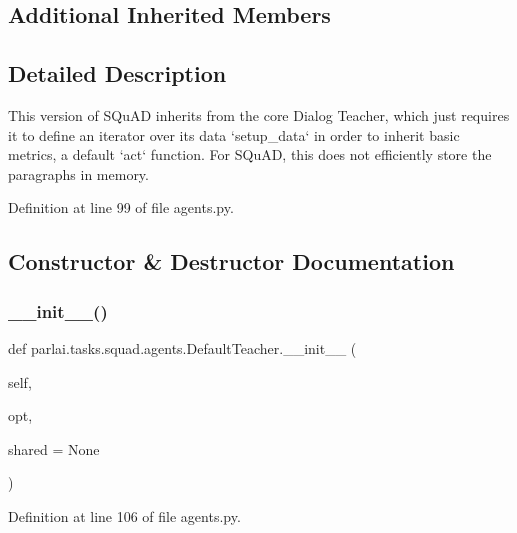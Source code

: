 \subsection*{Additional Inherited Members}


\subsection{Detailed Description}
\begin{DoxyVerb}This version of SQuAD inherits from the core Dialog Teacher, which just
requires it to define an iterator over its data `setup_data` in order to
inherit basic metrics, a default `act` function.
For SQuAD, this does not efficiently store the paragraphs in memory.
\end{DoxyVerb}
 

Definition at line 99 of file agents.\+py.



\subsection{Constructor \& Destructor Documentation}
\mbox{\label{classparlai_1_1tasks_1_1squad_1_1agents_1_1DefaultTeacher_a22833504fb2903d282c7415396bfb3dd}} 
\subsubsection{\texorpdfstring{\+\_\+\+\_\+init\+\_\+\+\_\+()}{\_\_init\_\_()}}
{\footnotesize\ttfamily def parlai.\+tasks.\+squad.\+agents.\+Default\+Teacher.\+\_\+\+\_\+init\+\_\+\+\_\+ (\begin{DoxyParamCaption}\item[{}]{self,  }\item[{}]{opt,  }\item[{}]{shared = {\ttfamily None} }\end{DoxyParamCaption})}



Definition at line 106 of file agents.\+py.




